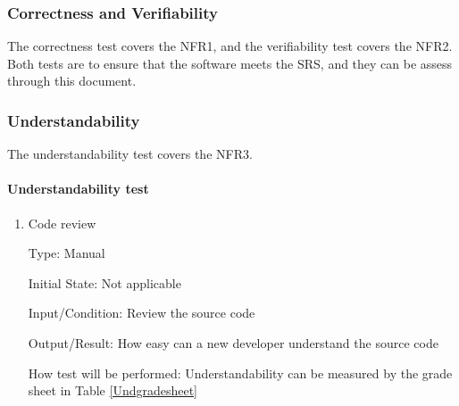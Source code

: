 \documentclass[12pt, titlepage]{article}
\begin{document}
\subsubsection{Correctness and Verifiability} \label{candv}
The correctness test covers the NFR1, and the verifiability test covers the
NFR2. Both tests are to ensure that the software meets the SRS, and they can 
be assess through this document.
		
\subsubsection{Understandability} \label{under}
The understandability test covers the NFR3.
\paragraph{Understandability test}

\begin{enumerate}

\item{Code review\\}

Type: Manual
					
Initial State: Not applicable
					
Input/Condition: Review the source code
					
Output/Result: How easy can a new developer understand the source code
					
How test will be performed: Understandability can be measured by the grade 
sheet in Table \ref{Undgradesheet}

\end{enumerate}
\end{document}
